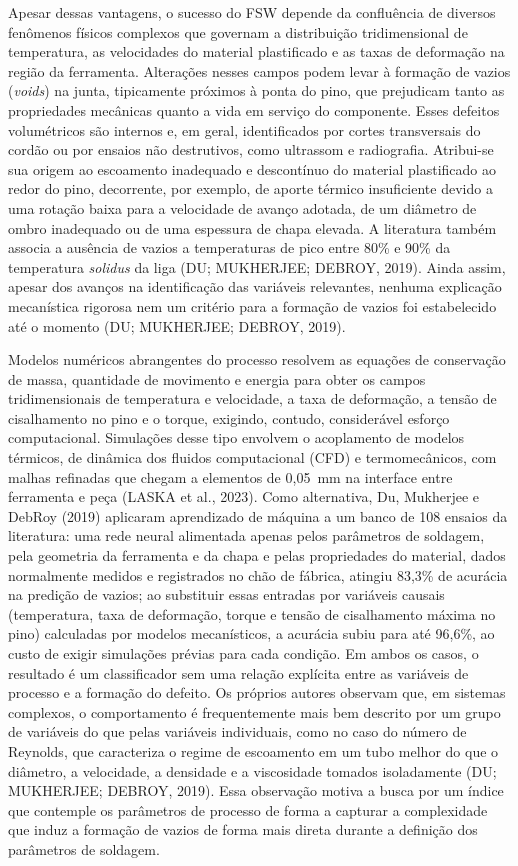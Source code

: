 \documentclass[12pt,openany]{report}
\begin{document}
Apesar dessas vantagens, o sucesso do FSW depende da confluência de diversos fenômenos físicos complexos que governam a distribuição tridimensional de temperatura, as velocidades do material plastificado e as taxas de deformação na região da ferramenta. Alterações nesses campos podem levar à formação de vazios (\textit{voids}) na junta, tipicamente próximos à ponta do pino, que prejudicam tanto as propriedades mecânicas quanto a vida em serviço do componente. Esses defeitos volumétricos são internos e, em geral, identificados por cortes transversais do cordão ou por ensaios não destrutivos, como ultrassom e radiografia. Atribui-se sua origem ao escoamento inadequado e descontínuo do material plastificado ao redor do pino, decorrente, por exemplo, de aporte térmico insuficiente devido a uma rotação baixa para a velocidade de avanço adotada, de um diâmetro de ombro inadequado ou de uma espessura de chapa elevada. A literatura também associa a ausência de vazios a temperaturas de pico entre 80\% e 90\% da temperatura \textit{solidus} da liga (DU; MUKHERJEE; DEBROY, 2019). Ainda assim, apesar dos avanços na identificação das variáveis relevantes, nenhuma explicação mecanística rigorosa nem um critério para a formação de vazios foi estabelecido até o momento (DU; MUKHERJEE; DEBROY, 2019).

Modelos numéricos abrangentes do processo resolvem as equações de conservação de massa, quantidade de movimento e energia para obter os campos tridimensionais de temperatura e velocidade, a taxa de deformação, a tensão de cisalhamento no pino e o torque, exigindo, contudo, considerável esforço computacional. Simulações desse tipo envolvem o acoplamento de modelos térmicos, de dinâmica dos fluidos computacional (CFD) e termomecânicos, com malhas refinadas que chegam a elementos de 0,05~mm na interface entre ferramenta e peça (LASKA et al., 2023). Como alternativa, Du, Mukherjee e DebRoy (2019) aplicaram aprendizado de máquina a um banco de 108 ensaios da literatura: uma rede neural alimentada apenas pelos parâmetros de soldagem, pela geometria da ferramenta e da chapa e pelas propriedades do material, dados normalmente medidos e registrados no chão de fábrica, atingiu 83,3\% de acurácia na predição de vazios; ao substituir essas entradas por variáveis causais (temperatura, taxa de deformação, torque e tensão de cisalhamento máxima no pino) calculadas por modelos mecanísticos, a acurácia subiu para até 96,6\%, ao custo de exigir simulações prévias para cada condição. Em ambos os casos, o resultado é um classificador sem uma relação explícita entre as variáveis de processo e a formação do defeito. Os próprios autores observam que, em sistemas complexos, o comportamento é frequentemente mais bem descrito por um grupo de variáveis do que pelas variáveis individuais, como no caso do número de Reynolds, que caracteriza o regime de escoamento em um tubo melhor do que o diâmetro, a velocidade, a densidade e a viscosidade tomados isoladamente (DU; MUKHERJEE; DEBROY, 2019). Essa observação motiva a busca por um índice que contemple os parâmetros de processo de forma a capturar a complexidade que induz a formação de vazios de forma mais direta durante a definição dos parâmetros de soldagem.
\end{document}

